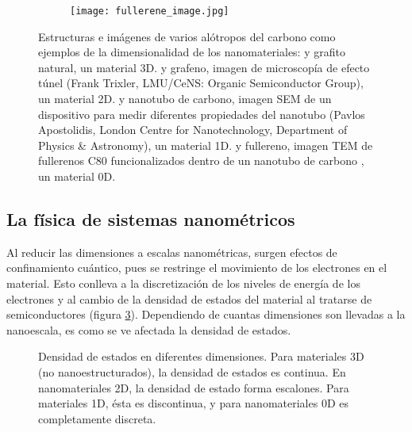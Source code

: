 \begin{figure}
\begin{subfigure}[b]{0.2\textwidth}
		\texttt{[image: fullerene\_image.jpg]}
		\caption{}
		\label{fig:fullerene_image}
	\end{subfigure}
	\caption[Alótropos del carbono mostrando las diferentes dimensionalidades de los nanomateriales]{Estructuras e imágenes de varios alótropos del carbono como ejemplos de la dimensionalidad de los nanomateriales:   y  grafito natural, un material 3D.  y  grafeno, imagen de microscopía de efecto túnel (Frank Trixler, LMU/CeNS: Organic Semiconductor Group), un material 2D.  y  nanotubo de carbono, imagen SEM de un dispositivo para medir diferentes propiedades del nanotubo (Pavlos Apostolidis, London Centre for Nanotechnology, Department of Physics \& Astronomy), un material 1D.  y  fullereno, imagen TEM de fullerenos C80 funcionalizados dentro de un nanotubo de carbono \citep{Gimenez2011}, un material 0D.}
	\label{fig:carbon_allotropes}
\end{figure}

\subsection{La física de sistemas nanométricos}
Al reducir las dimensiones a escalas nanométricas, surgen efectos de confinamiento cuántico, pues se restringe el movimiento de los electrones en el material. Esto conlleva a la discretización de los niveles de energía de los electrones y al cambio de la densidad de estados del material al tratarse de semiconductores (figura \ref{fig:DoE}). Dependiendo de cuantas dimensiones son llevadas a la nanoescala, es como se ve afectada la densidad de estados.

\begin{figure}[h!]
	\centering
	\caption[Densidad de estados en diferentes dimensionalidades]{Densidad de estados en diferentes dimensiones. Para materiales 3D (no nanoestructurados), la densidad de estados es continua. En nanomateriales 2D, la densidad de estado forma escalones. Para materiales 1D, ésta es discontinua, y para nanomateriales 0D es completamente discreta. }
	\label{fig:DoE}
\end{figure}

